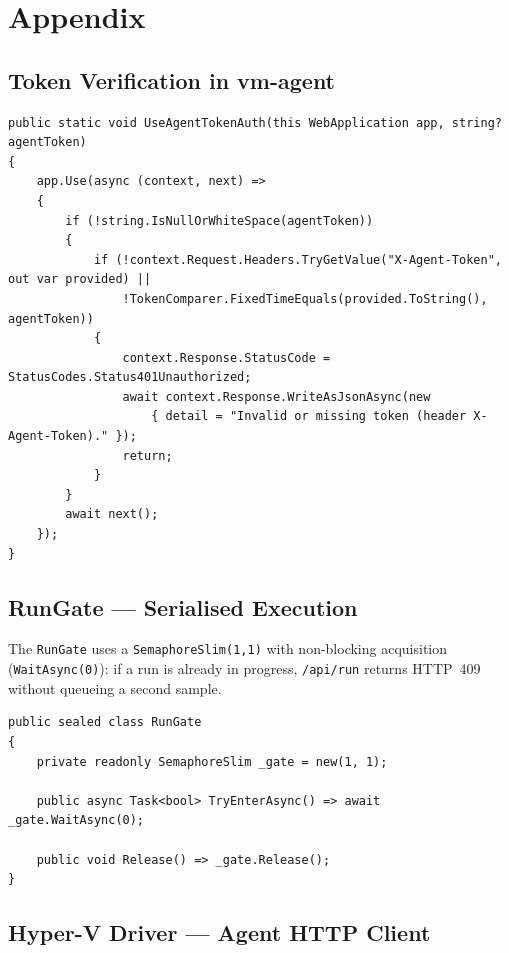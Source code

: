 \chapter{Appendix}

\section{Token Verification in vm-agent}

\begin{lstlisting}[caption={[Authentication middleware]{Authentication middleware --- \filepath{vm-agent/Security/AgentTokenMiddleware.cs}}},label={lst:vm-agent-token}]
public static void UseAgentTokenAuth(this WebApplication app, string? agentToken)
{
    app.Use(async (context, next) =>
    {
        if (!string.IsNullOrWhiteSpace(agentToken))
        {
            if (!context.Request.Headers.TryGetValue("X-Agent-Token", out var provided) ||
                !TokenComparer.FixedTimeEquals(provided.ToString(), agentToken))
            {
                context.Response.StatusCode = StatusCodes.Status401Unauthorized;
                await context.Response.WriteAsJsonAsync(new
                    { detail = "Invalid or missing token (header X-Agent-Token)." });
                return;
            }
        }
        await next();
    });
}
\end{lstlisting}

\section{RunGate --- Serialised Execution}

The \texttt{RunGate} uses a \texttt{SemaphoreSlim(1,1)} with non-blocking acquisition
(\texttt{WaitAsync(0)}): if a run is already in progress, \texttt{/api/run} returns HTTP~409
without queueing a second sample.

\begin{lstlisting}[style=csharp,caption={[Single-run gate]{Single-run gate --- \filepath{vm-agent/State/RunGate.cs}}},label={lst:run-gate}]
public sealed class RunGate
{
    private readonly SemaphoreSlim _gate = new(1, 1);

    public async Task<bool> TryEnterAsync() => await _gate.WaitAsync(0);

    public void Release() => _gate.Release();
}
\end{lstlisting}

\section{Hyper-V Driver --- Agent HTTP Client}

